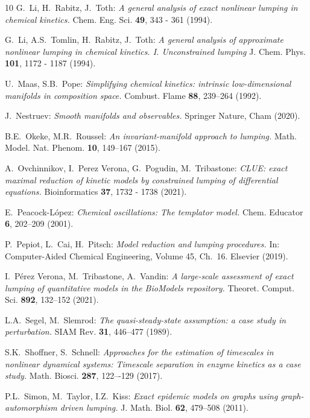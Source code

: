 \documentclass{article}
\begin{document}
\begin{thebibliography}{10}
   G.~Li, H.~Rabitz, J.~Toth: {\it  A general analysis of exact 
nonlinear lumping in chemical kinetics.} Chem. Eng. Sci. {\bf 49}, 343 - 361 (1994).

  G.~Li, A.S.~Tomlin, H.~Rabitz, J.~Toth: {\it  A general 
analysis of approximate nonlinear lumping in chemical kinetics. I. Unconstrained 
lumping} J. Chem. Phys. {\bf 101}, 1172 - 1187 (1994).

 U.~Maas, S.B.~Pope: {\it Simplifying chemical kinetics: 
intrinsic low-dimensional manifolds in composition space.} Combust. Flame 
{\bf 88}, 239--264 (1992).

 J.\ Nestruev: {\it Smooth manifolds and observables.} Springer 
Nature, Cham (2020).

 B.E.~Okeke, M.R.~Roussel: {\it An invariant-manifold approach 
to lumping.} Math. Model. Nat. Phenom. {\bf 10}, 149–167 (2015).

 A.~Ovchinnikov, I.~Perez Verona, G.~Pogudin, M.~Tribastone: 
{\it CLUE: exact maximal reduction of kinetic models by constrained lumping of 
differential equations.} Bioinformatics {\bf 37}, 1732 - 1738 (2021).

 E.~Peacock-L\'opez: {\it Chemical oscillations: The 
templator model.} Chem. Educator {\bf 6}, 202--209 (2001).

 P.~Pepiot, L.~Cai, H.~Pitsch: {\it  Model reduction and
lumping procedures.} In: Computer-Aided Chemical Engineering, Volume 45, 
Ch.~16. Elsevier (2019).

 I.~P\'erez Verona, M.~Tribastone, A.~Vandin: 
{\it A large-scale assessment of exact lumping of quantitative models in 
the BioModels repository.} Theoret. Comput. Sci. {\bf 892}, 132--152 (2021).

 L.A.~Segel, M.~Slemrod: {\it The quasi-steady-state 
assumption: a case study in perturbation.} SIAM Rev. {\bf 31}, 446--477 (1989).

S.K.~Shoffner, S.~Schnell: {\it Approaches for the estimation of timescales in 
nonlinear dynamical systems: Timescale separation in enzyme kinetics as a case 
study.} Math. Biosci. {\bf 287}, 122–-129 (2017). 

 P.L.~Simon, M.~Taylor, I.Z.~Kiss: {\it Exact 
epidemic models on graphs using graph-automorphism driven lumping.} 
J. Math. Biol. {\bf 62}, 479--508 (2011).


\end{thebibliography}
\end{document}
